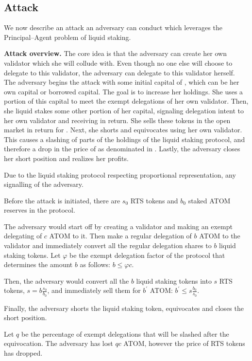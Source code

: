 \subsection{Attack}

We now describe an attack an adversary can conduct which leverages the
Principal--Agent problem of liquid staking.

\noindent
\textbf{Attack overview.}
The core idea is that the adversary can create her own validator
which she will collude with.
Even though no one else will choose to delegate to
this validator, the adversary can delegate to this validator herself.
The adversary begins the attack with some initial capital of \asset, which
can be her own capital or borrowed capital. The goal is to increase her
\asset holdings. She uses a portion of this capital to meet the exempt
delegations of her own validator. Then, she liquid stakes some other
portion of her capital, signaling delegation intent to her own validator
and receiving \stasset in return. She sells these tokens in the open
market in return for \asset. Next, she shorts \stasset and equivocates
using her own validator. This causes a slashing of parts of the \asset
holdings of the liquid staking protocol, and therefore a drop in the
price of \stasset as denominated in \asset. Lastly, the adversary
closes her short position and realizes her profits.

Due to the liquid staking protocol respecting proportional
representation, any signalling of the adversary.

Before the attack is initiated, there are $s_0$ RTS tokens and $b_0$
staked ATOM reserves in the protocol.

The adversary would start off by creating a validator and making an
exempt delegating of $c$ ATOM to it.
Then make a regular delegation of $b$ ATOM to the validator and
immediately convert all the regular delegation shares to $b$ liquid
staking tokens.
Let $\varphi$ be the exempt delegation factor of the protocol
that determines the amount $b$ as follows: $b \leq \varphi c$.

Then, the adversary would convert all the $b$ liquid staking tokens into
$s$ RTS tokens, $s = b \frac{s_0}{b_0}$, and immediately sell them for
$b^{'}$ ATOM: $b^{'} \leq s \frac{b_0}{s_0}$.

Finally, the adversary shorts the liquid staking token, equivocates
and closes the short position.

Let $q$ be the percentage of exempt delegations that will be slashed after
the equivocation. The adversary has lost $qc$ ATOM, however the price of RTS
tokens has dropped.

